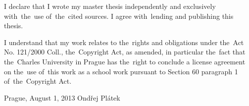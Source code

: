\vspace{\fill} %
\medskip\noindent
I declare that I wrote my master thesis independently and exclusively with~the~use of~the~cited sources. I agree with~lending and publishing this thesis.

I understand that my work relates to the~rights and obligations under the~Act No. 121/2000 Coll., the~Copyright Act, as amended, in particular the~fact that the~Charles University in Prague has the~right to conclude a license agreement on the~use of~this work as a school work pursuant to Section 60 paragraph 1 of~the~Copyright Act.

\noindent Prague, August 1, 2013 \hspace{\fill}Ondřej Plátek 


%

\newpage

